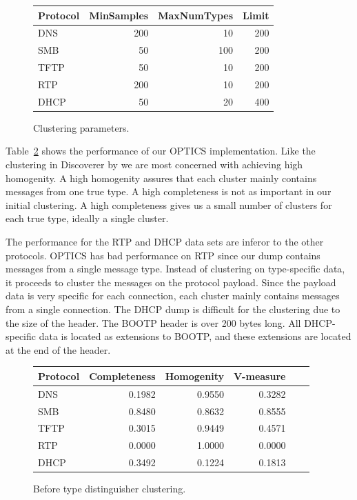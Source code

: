 \documentclass[a4paper]{report}
\begin{document}
\begin{figure}[h]
    \centering
    \begin{tabular}{| l | r | r | r |}
        \hline
        \textbf{Protocol}&\textbf{MinSamples}&\textbf{MaxNumTypes}&\textbf{Limit} \\ \hline
        DNS & 200 & 10 & 200 \\ \hline
        SMB & 50 & 100 & 200 \\ \hline
        TFTP & 50 & 10 & 200 \\ \hline
        RTP & 200 & 10 & 200 \\ \hline
        DHCP & 50 & 20 & 400 \\ \hline
    \end{tabular}
    \caption{Clustering parameters.}
    \label{table:clusterparams}
\end{figure}

Table~\ref{table:initclusterresults} shows the performance of our OPTICS
implementation. Like the clustering in Discoverer by \citeauthor{cui07} we
are most concerned with achieving high homogenity. A high homogenity assures
that each cluster mainly contains messages from one true type. A high
completeness is not as important in our initial clustering. A high completeness
gives us a small number of clusters for each true type, ideally a single
cluster.

The performance for the RTP and DHCP data sets are inferor to the other
protocols. OPTICS has bad performance on RTP since our dump contains messages
from a single message type. Instead of clustering on type-specific data, it
proceeds to cluster the messages on the protocol payload. Since the payload
data is very specific for each connection, each cluster mainly contains
messages from a single connection. The DHCP dump is difficult for the
clustering due to the size of the header. The BOOTP header is over 200 bytes
long. All DHCP-specific data is located as extensions to BOOTP, and these
extensions are located at the end of the header.

\begin{figure}[h]
    \centering
    \begin{tabular}{| l | r | r | r | r | r |}
        \hline
        \textbf{Protocol}&\textbf{Completeness}&\textbf{Homogenity}&\textbf{V-measure} \\ \hline
        DNS & 0.1982 & 0.9550 & 0.3282 \\ \hline
        SMB & 0.8480 & 0.8632 & 0.8555 \\ \hline
        TFTP & 0.3015 & 0.9449 & 0.4571 \\ \hline
        RTP & 0.0000 & 1.0000 & 0.0000 \\ \hline
        DHCP & 0.3492 & 0.1224 & 0.1813 \\ \hline
    \end{tabular}
    \caption{Before type distinguisher clustering.}
    \label{table:initclusterresults}
\end{figure}
\end{document}
